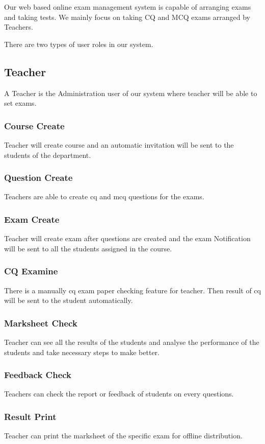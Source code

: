 \documentclass[10pt]{article}
\begin{document}
Our web based online exam management system is capable of arranging exams and taking tests. We mainly focus on taking CQ and MCQ exams arranged by Teachers.

There are two types of user roles  in our system.

\subsection{Teacher}
A Teacher is the Administration user of our system where teacher will be able to set exams.

\subsubsection{Course Create} Teacher will create course and an automatic invitation will be sent to the students of the department.
\subsubsection{Question Create} Teachers are able to create cq and mcq questions for the exams.
\subsubsection{Exam Create} Teacher will create exam after questions are created and the exam Notification will be sent to all the students assigned in the course.
\subsubsection{CQ Examine} There is a manually cq exam paper checking feature for teacher. Then result of cq will be sent to the student automatically.
\subsubsection{Marksheet Check} Teacher can see all the results of the students and analyse the performance of the students and take necessary steps to make better.
\subsubsection{Feedback Check} Teachers can check the report or feedback of students on every questions.
\subsubsection{Result Print} Teacher can print the marksheet of the specific exam for offline distribution.
\end{document}
